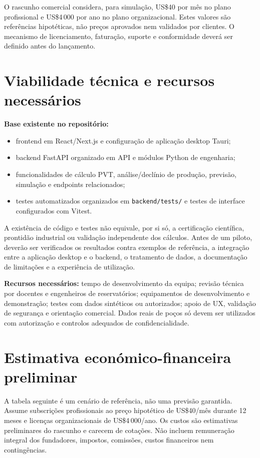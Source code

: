 \documentclass[11pt,a4paper]{article}
\newcommand{\usd}{US\$}
\begin{document}
O rascunho comercial considera, para simulação, \usd 40 por mês no plano profissional
e \usd 4\,000 por ano no plano organizacional. Estes valores são referências
hipotéticas, não preços aprovados nem validados por clientes. O mecanismo de
licenciamento, faturação, suporte e conformidade deverá ser definido antes do
lançamento.

\section{Viabilidade técnica e recursos necessários}

\textbf{Base existente no repositório:}
\begin{itemize}
  \item frontend em React/Next.js e configuração de aplicação desktop Tauri;
  \item backend FastAPI organizado em API e módulos Python de engenharia;
  \item funcionalidades de cálculo PVT, análise/declínio de produção, previsão,
  simulação e endpoints relacionados;
  \item testes automatizados organizados em \texttt{backend/tests/} e testes de
  interface configurados com Vitest.
\end{itemize}

A existência de código e testes não equivale, por si só, a certificação científica,
prontidão industrial ou validação independente dos cálculos. Antes de um piloto,
deverão ser verificados os resultados contra exemplos de referência, a integração
entre a aplicação desktop e o backend, o tratamento de dados, a documentação de
limitações e a experiência de utilização.

\textbf{Recursos necessários:} tempo de desenvolvimento da equipa; revisão técnica
por docentes e engenheiros de reservatórios; equipamentos de desenvolvimento e
demonstração; testes com dados sintéticos ou autorizados; apoio de UX, validação de
segurança e orientação comercial. Dados reais de poços só devem ser utilizados com
autorização e controlos adequados de confidencialidade.

\section{Estimativa económico-financeira preliminar}

A tabela seguinte é um cenário de referência, não uma previsão garantida. Assume
subscrições profissionais ao preço hipotético de \usd 40/mês durante 12 meses e
licenças organizacionais de \usd 4\,000/ano. Os custos são estimativas preliminares
do rascunho e carecem de cotações. Não incluem remuneração integral dos fundadores,
impostos, comissões, custos financeiros nem contingências.
\end{document}
